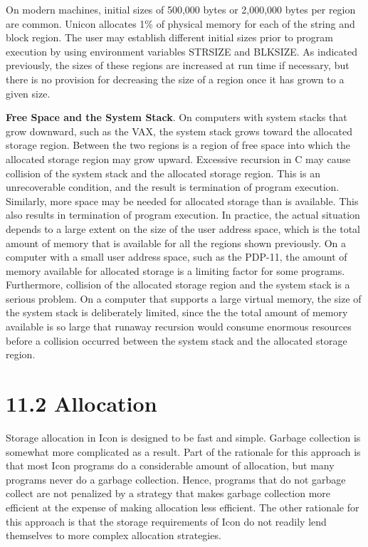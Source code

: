 On modern machines, initial sizes of 500,000 bytes or 2,000,000 bytes
per region are common. Unicon allocates 1\% of physical memory for
each of the string and block region. The user may establish different
initial sizes prior to program execution by using environment
variables STRSIZE and BLKSIZE. As indicated previously, the sizes of
these regions are increased at run time if necessary, but there is no
provision for decreasing the size of a region once it has grown to a
given size.

\textbf{Free Space and the System Stack}. On computers with system
stacks that grow downward, such as the VAX, the system stack grows
toward the allocated storage region. Between the two regions is a
region of free space into which the allocated storage region may grow
upward. Excessive recursion in C may cause collision of the system
stack and the allocated storage region. This is an unrecoverable
condition, and the result is termination of program execution.
Similarly, more space may be needed for allocated storage than is
available. This also results in termination of program execution. In
practice, the actual situation depends to a large extent on the size
of the user address space, which is the total amount of memory that is
available for all the regions shown previously. On a computer with a
small user address space, such as the PDP-11, the amount of memory
available for allocated storage is a limiting factor for some
programs. Furthermore, collision of the allocated storage region and
the system stack is a serious problem. On a computer that supports a
large virtual memory, the size of the system stack is deliberately
limited, since the the total amount of memory available is so large
that runaway recursion would consume enormous resources before a
collision occurred between the system stack and the allocated storage
region.

\section[11.2 Allocation]{11.2 Allocation}

Storage allocation in Icon is designed to be fast and simple. Garbage
collection is somewhat more complicated as a result. Part of the
rationale for this approach is that most Icon programs do a
considerable amount of allocation, but many programs never do a
garbage collection. Hence, programs that do not garbage collect are
not penalized by a strategy that makes garbage collection more
efficient at the expense of making allocation less efficient. The
other rationale for this approach is that the storage requirements of
Icon do not readily lend themselves to more complex allocation
strategies.

